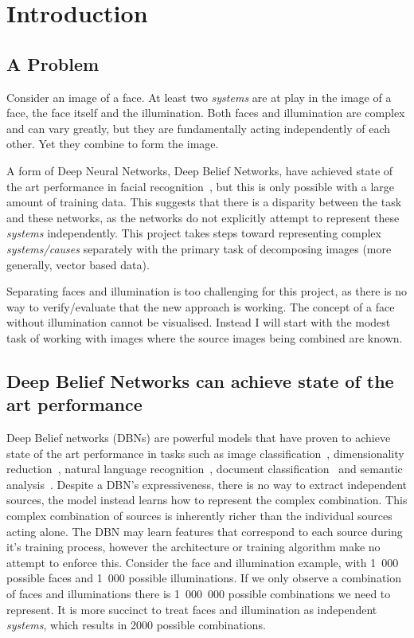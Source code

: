 \chapter{Introduction}

\section{A Problem}
Consider an image of a face. At least two \emph{systems} are at play in the image of a face, the face itself and the illumination. Both faces and illumination are complex and can vary greatly, but they are fundamentally acting independently of each other. Yet they combine to form the image.

A form of Deep Neural Networks, Deep Belief Networks, have achieved state of the art performance in facial recognition~\cite{huang2012learning,liu2014facial}, but this is only possible with a large amount of training data. This suggests that there is a disparity between the task and these networks, as the networks do not explicitly attempt to represent these \emph{systems} independently. This project takes steps toward representing complex \emph{systems/causes} separately with the primary task of decomposing images (more generally, vector based data).

Separating faces and illumination is too challenging for this project, as there is no way to verify/evaluate that the new approach is working. The concept of a face without illumination cannot be visualised. Instead I will start with the modest task of working with images where the source images being combined are known.

\section{Deep Belief Networks can achieve state of the art performance}
Deep Belief networks (DBNs) are powerful models that have proven to achieve state of the art performance in tasks such as image classification~\cite{5649922, Hinton:2006:FLA:1161603.1161605}, dimensionality reduction~\cite{noulas2008deep}, natural language recognition~\cite{Hinton:38131ww}, document classification~\cite{mcafee2008document} and semantic analysis~\cite{kim2012learning}.
Despite a DBN's expressiveness, there is no way to extract independent sources, the model instead learns how to represent the complex combination. This complex combination of sources is inherently richer than the individual sources acting alone. The DBN may learn features that correspond to each source during it's training process, however the architecture or training algorithm make no attempt to enforce this. Consider the face and illumination example, with 1~000 possible faces and 1~000 possible illuminations. If we only observe a combination of faces and illuminations there is 1~000~000 possible combinations we need to represent. It is more succinct to treat faces and illumination as independent \emph{systems}, which results in 2000 possible combinations.


